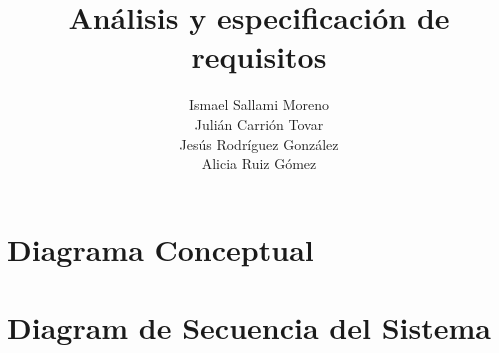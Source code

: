 \documentclass[twoside,openright,titlepage,numbers=noenddot,headinclude,footinclude=true,
cleardoublepage=empty,abstractoff,BCOR=5mm,paper=a4,fontsize=12pt,main=spanish,pdfstartpage=1]{scrreprt}
\author{Ismael Sallami Moreno \\ Julián Carrión Tovar \\ Jesús Rodríguez González \\ Alicia Ruiz Gómez}
\title{Análisis y especificación de requisitos}
\theoremstyle{plain}
\begin{document}
\maketitle


\onehalfspacing

\tableofcontents

\chapter{Diagrama Conceptual}

\chapter{Diagram de Secuencia del Sistema}









%

\end{document}
